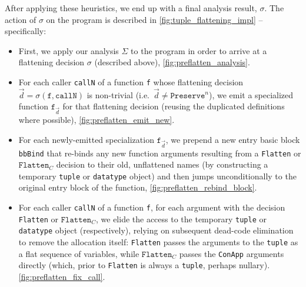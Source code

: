 


After applying these heuristics, we end up with a final analysis result,
$\sigma$. The action of $\sigma$ on the program is described
in \cref{fig:tuple_flattening_impl} -- specifically:
\begin{itemize}

\item
First, we apply our analysis $\Sigma$ to the program in order
to arrive at a flattening decision $\sigma$ (described above),
\cref{fig:preflatten_analysis}.

\item For each caller \texttt{callN} of a function \texttt{f} whose
flattening decision $\vec{d} = \sigma(\texttt{f}, \texttt{callN})$ is
non-trivial (i.e.\ $\vec{d} \neq \texttt{Preserve}^n$), we emit a specialized
function $\texttt{f}_{\vec{d}}$ for that flattening decision
(reusing the duplicated definitions where
possible), \cref{fig:preflatten_emit_new}.

\item For each newly-emitted specialization $\texttt{f}_{\vec{d}}$,
we prepend a new entry basic block \texttt{bbBind} that re-binds any new function
arguments resulting from a \texttt{Flatten} or $\texttt{Flatten}_C$ decision to
their old, unflattened names (by constructing a temporary \texttt{tuple}
or \texttt{datatype} object) and then jumps unconditionally to the original
entry block of the function, \cref{fig:preflatten_rebind_block}.


\item For each caller \texttt{callN} of a function \texttt{f},
for each argument with the decision \texttt{Flatten} or $\texttt{Flatten}_C$, we
elide the access to the temporary \texttt{tuple} or \texttt{datatype} object
(respectively), relying on subsequent dead-code elimination to remove the
allocation itself: \texttt{Flatten} passes the arguments to the \texttt{tuple}
as a flat sequence of variables, while $\texttt{Flatten}_C$ passes
the \texttt{ConApp} arguments directly (which, prior to \texttt{Flatten} is
always a \texttt{tuple}, perhaps nullary).
\cref{fig:preflatten_fix_call}.



\end{itemize}

